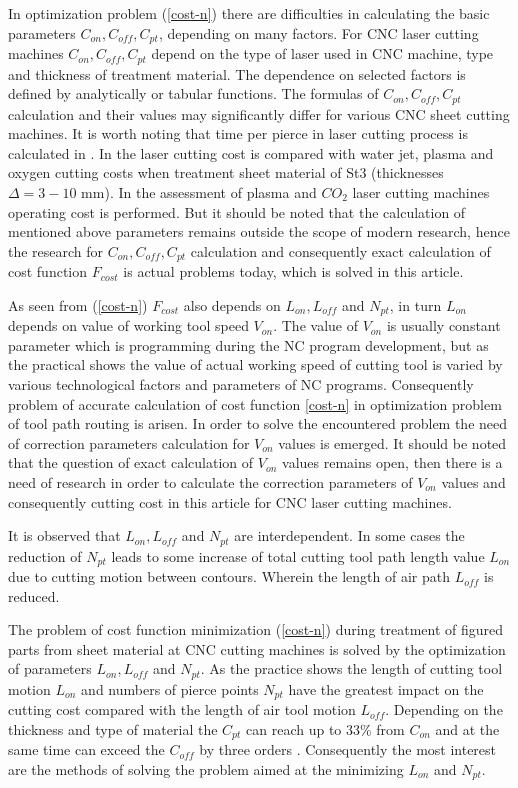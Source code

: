 \documentclass[runningheads]{llncs}
\begin{document}
In optimization problem (\ref{cost-n})
there are difficulties in calculating the basic parameters
$C_{on}, C_{off}, C_{pt}$,
depending on many factors.
For CNC laser cutting machines $C_{on}, C_{off}, C_{pt}$
depend on the type of laser used in CNC machine,
type and thickness of treatment material.
The dependence on selected factors is defined by analytically or tabular functions.
The formulas of $C_{on}, C_{off}, C_{pt}$
calculation and their values may significantly differ for various CNC sheet cutting machines.
It is worth noting that time per pierce in laser cutting process is calculated in \cite{ru06}.
In \cite{ru07} the laser cutting cost is compared with water jet,
plasma and oxygen cutting costs when treatment sheet material of St3
(thicknesses $\Delta=3-10$ mm).
In \cite{ru08} the assessment of plasma and $CO_2$ laser cutting machines operating cost is performed.
But it should be noted that the calculation of mentioned above parameters
remains outside the scope of modern research,
hence the research for $C_{on}, C_{off}, C_{pt}$
calculation and consequently exact calculation of cost function $F_{cost}$
is actual problems today, which is solved in this article.

As seen from (\ref{cost-n})
$F_{cost}$
also depends on
$L_{on}, L_{off}$ and $N_{pt}$,
in turn $L_{on}$ depends on value of working tool speed $V_{on}$.
The value of $V_{on}$ is usually constant parameter
which is programming during the NC program development,
but as the practical shows \cite{ru09,Tavaeva2015Nov}
the value of actual working speed of cutting tool
is varied by various technological factors and parameters of NC programs.
Consequently problem of accurate calculation of cost function \ref{cost-n}
in optimization problem of tool path routing is arisen.
In order to solve the encountered problem
the need of correction parameters calculation for $V_{on}$
values is emerged.
It should be noted that
the question of exact calculation of  $V_{on}$ values remains open,
then there is a need of research in order to calculate the correction parameters of  $V_{on}$
values and consequently cutting cost in this article for CNC laser cutting machines.

It is observed that $L_{on}, L_{off}$ and $N_{pt}$
are interdependent.
In some cases the reduction of  $N_{pt}$
leads to some increase of total cutting tool path length value $L_{on}$
due to cutting motion between contours.
Wherein the length of air path $L_{off}$ is reduced.

The problem of cost function minimization (\ref{cost-n})
during treatment of figured parts from sheet material
at CNC cutting machines is solved by the optimization of parameters
$L_{on}, L_{off}$ and $N_{pt}$.
As the practice shows the length of cutting tool motion  $L_{on}$
and numbers of pierce points $N_{pt}$
have the greatest impact on the cutting cost compared with the length of air tool motion $L_{off}$.
Depending on the thickness and type of material the $C_{pt}$
can reach up to 33\% from $C_{on}$
and at the same time can exceed the $C_{off}$
by three orders \cite{ru14}.
Consequently the most interest are the methods of solving the problem aimed at the minimizing
$L_{on}$ and $N_{pt}$.
\end{document}
